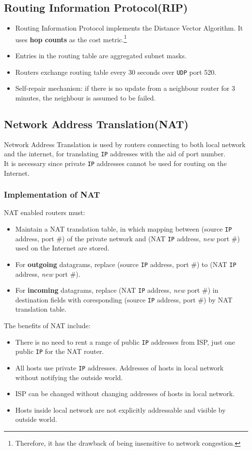 \documentclass[12pt]{article}
\newcommand\UDP{\texttt{UDP} }
\newcommand\IP{\texttt{IP} }
\theoremstyle{definition}
\begin{document}
\subsection{Routing Information Protocol(RIP)}
\begin{itemize}
\item Routing Information Protocol implements the Distance Vector Algorithm. It uses \textbf{hop counts} as the cost metric.\footnote{Therefore, it has the drawback of being insensitive to network congestion.}\\
\item Entries in the routing table are aggregated subnet masks.
\item Routers exchange routing table every 30 seconds over \UDP port 520.
\item Self-repair mechanism: if there is no update from a neighbour router for 3 minutes, the neighbour is assumed to be failed.
\end{itemize}
\subsection{Network Address Translation(NAT)}
Network Address Translation is used by routers connecting to both local network and the internet, for translating \IP addresses with the aid of port number. \\It is necessary since private \IP addresses cannot be used for routing on the Internet.
\subsubsection{Implementation of NAT}
NAT enabled routers must:
\begin{itemize}
  \item Maintain a NAT translation table, in which mapping between (source \IP address, port \#) of the private network and (NAT \IP address, \textit{new} port \#) used on the Internet are stored.
  \item For \textbf{outgoing} datagrams, replace (source \IP address, port \#) to (NAT \IP address, \textit{new} port \#).
  \item For \textbf{incoming} datagrams, replace (NAT \IP address, \textit{new} port \#) in destination fields with coresponding (source \IP address, port \#) by NAT translation table.
\end{itemize} 
The benefits of NAT include:
\begin{itemize}
  \item There is no need to rent a range of public \IP addresses from ISP, just one public \IP for the NAT router.
  \item All hosts use private \IP addresses. Addresses of hosts in local network without notifying the outside world.
  \item ISP can be changed without changing addresses of hosts in local network.
  \item Hosts inside local network are not explicitly addressable and visible by outside world.
\end{itemize}
\end{document}
